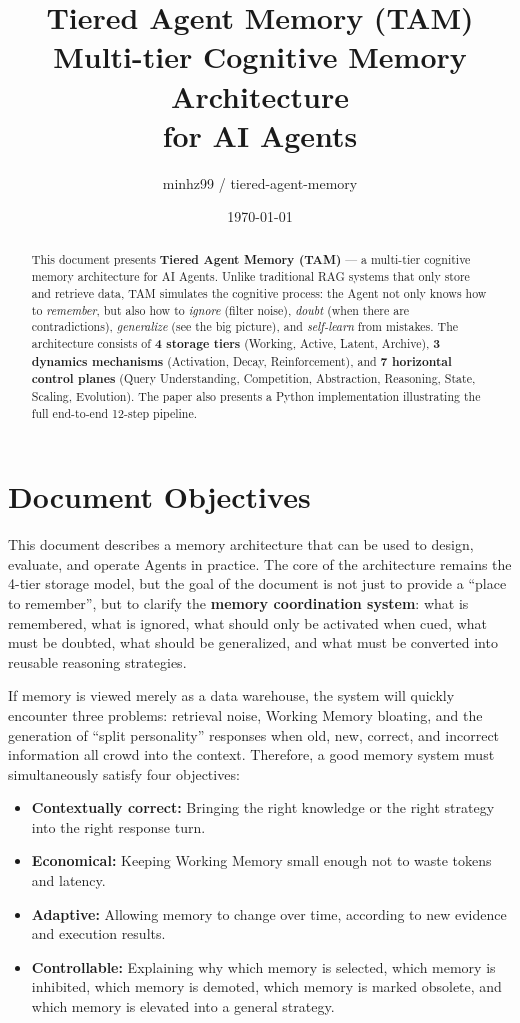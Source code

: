 \documentclass[a4paper,12pt]{article}
\title{\textbf{Tiered Agent Memory (TAM)}\\[6pt]
  \large Multi-tier Cognitive Memory Architecture\\for AI Agents}
\author{minhz99 / tiered-agent-memory}
\date{\today}
\begin{document}
\maketitle

\begin{abstract}
This document presents \textbf{Tiered Agent Memory (TAM)} --- a multi-tier cognitive memory architecture for AI Agents. Unlike traditional RAG systems that only store and retrieve data, TAM simulates the cognitive process: the Agent not only knows how to \emph{remember}, but also how to \emph{ignore} (filter noise), \emph{doubt} (when there are contradictions), \emph{generalize} (see the big picture), and \emph{self-learn} from mistakes. The architecture consists of \textbf{4 storage tiers} (Working, Active, Latent, Archive), \textbf{3 dynamics mechanisms} (Activation, Decay, Reinforcement), and \textbf{7 horizontal control planes} (Query Understanding, Competition, Abstraction, Reasoning, State, Scaling, Evolution). The paper also presents a Python implementation illustrating the full end-to-end 12-step pipeline.
\end{abstract}

\tableofcontents
\newpage

\section{Document Objectives}

This document describes a memory architecture that can be used to design, evaluate, and operate Agents in practice. The core of the architecture remains the 4-tier storage model, but the goal of the document is not just to provide a ``place to remember'', but to clarify the \textbf{memory coordination system}: what is remembered, what is ignored, what should only be activated when cued, what must be doubted, what should be generalized, and what must be converted into reusable reasoning strategies.

If memory is viewed merely as a data warehouse, the system will quickly encounter three problems: retrieval noise, Working Memory bloating, and the generation of ``split personality'' responses when old, new, correct, and incorrect information all crowd into the context. Therefore, a good memory system must simultaneously satisfy four objectives:
\begin{itemize}
    \item \textbf{Contextually correct:} Bringing the right knowledge or the right strategy into the right response turn.
    \item \textbf{Economical:} Keeping Working Memory small enough not to waste tokens and latency.
    \item \textbf{Adaptive:} Allowing memory to change over time, according to new evidence and execution results.
    \item \textbf{Controllable:} Explaining why which memory is selected, which memory is inhibited, which memory is demoted, which memory is marked obsolete, and which memory is elevated into a general strategy.
\end{itemize}
\end{document}
